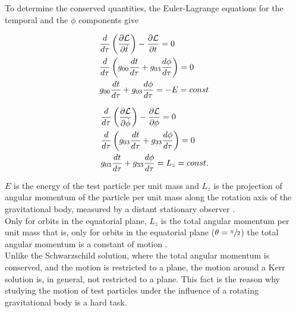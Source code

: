 To determine the conserved quantities, the Euler-Lagrange equations for the temporal and the $\phi$ components \cite{Bambi} give
\begin{multicols}{2}
\begin{align}
\notag
	&\frac{d}{d\tau}\left(\frac{\partial \mathcal{L} }{\partial \dot{t}}\right) - \frac{\partial \mathcal{L}}{\partial t} = 0\\
\notag
	&\frac{d}{d\tau}\left(g_{00} \frac{dt}{d\tau} + g_{03}\frac{d\phi}{d\tau}\right) = 0\\
	\label{eq:eulerlagrangeE}
	&g_{00} \frac{dt}{d\tau} + g_{03}\frac{d\phi}{d\tau} = -E = const
\end{align}

\columnbreak
\begin{align}
\notag
	&\frac{d}{d\tau}\left(\frac{\partial \mathcal{L} }{\partial \dot{\phi}}\right) - \frac{\partial \mathcal{L}}{\partial \phi} = 0\\
\notag
	&\frac{d}{d\tau}\left(g_{03} \frac{dt}{d\tau} + g_{33}\frac{d\phi}{d\tau}\right) = 0\\
	\label{eq:eulerlagrangeL}
	&g_{03} \frac{dt}{d\tau} + g_{33}\frac{d\phi}{d\tau} = L_z = const.
\end{align}
\end{multicols}


$E$ is the energy of the test particle per unit mass and $L_z$ is the projection of angular momentum of the particle per unit mass along the rotation axis of the gravitational body, measured by a distant stationary observer  \cite{Misner}.\\

Only for orbits in the equatorial plane, $L_z$ is the total angular momentum per unit mass that is, only for orbits in the equatorial plane ($\theta = \sfrac{\pi}{2}$) the total angular momentum is a constant of motion \cite{Raine}.\\ %

Unlike the Schwarzschild solution, where the total angular momentum is conserved, and the motion is restricted to a plane, the motion around a Kerr solution is, in general, not restricted to a plane. This fact is the reason why studying the motion of test particles under the influence of a rotating gravitational body is a hard task.\\

